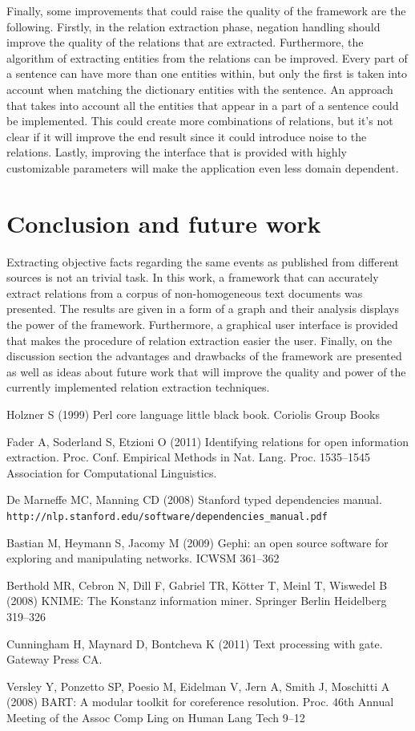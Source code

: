 \documentclass[]{article}
\begin{document}
Finally, some improvements that could raise the quality of the framework are the following. Firstly, in the relation extraction phase, negation handling  should improve the quality of the relations that are extracted. Furthermore, the algorithm of extracting entities from the relations can be improved. Every part of a sentence can have more than one entities within, but only the first is taken into account when matching the dictionary entities with the sentence. An approach that takes into account all the entities that appear in a part of a sentence could be implemented. This could create more combinations of relations, but it's not clear if it will improve the end result since it could introduce noise to the relations. Lastly, improving the interface that is provided with highly customizable parameters will make the application even less domain dependent.
%
\section{Conclusion and future work}
%
Extracting objective facts regarding the same events as published from different sources is not an trivial task. In this work, a framework that can accurately extract relations from a corpus of non-homogeneous text documents was presented. The results are given in a form of a graph and their analysis displays the power of the framework. Furthermore, a graphical user interface is provided that makes  the procedure of relation extraction easier the user. Finally, on the discussion section the advantages and drawbacks of the framework are presented as well as ideas about future work that will improve the quality and power of the currently implemented relation extraction techniques.
%
%
\begin{thebibliography}{99}
%

Holzner S (1999)
Perl core language little black book. 
Coriolis Group Books

Fader A, Soderland S, Etzioni O (2011) 
Identifying relations for open information extraction. 
Proc. Conf. Empirical Methods in Nat. Lang. Proc. 1535--1545
Association for Computational Linguistics.

De Marneffe MC, Manning CD (2008)
Stanford typed dependencies manual. \texttt{http://nlp.stanford.edu/software/dependencies\_manual.pdf}

Bastian M, Heymann S, Jacomy M (2009)
Gephi: an open source software for exploring and manipulating networks.
ICWSM 361--362

Berthold MR, Cebron N, Dill F, Gabriel TR, Kötter T, Meinl T, Wiswedel B (2008)
KNIME: The Konstanz information miner.
Springer Berlin Heidelberg 319--326

Cunningham H, Maynard D, Bontcheva K (2011)
Text processing with gate.
Gateway Press CA.

Versley Y, Ponzetto SP, Poesio M, Eidelman V, Jern A, Smith J, Moschitti A (2008)
BART: A modular toolkit for coreference resolution.
Proc. 46th Annual Meeting of the Assoc Comp Ling on Human Lang Tech 9--12

\end{thebibliography}
\end{document}
